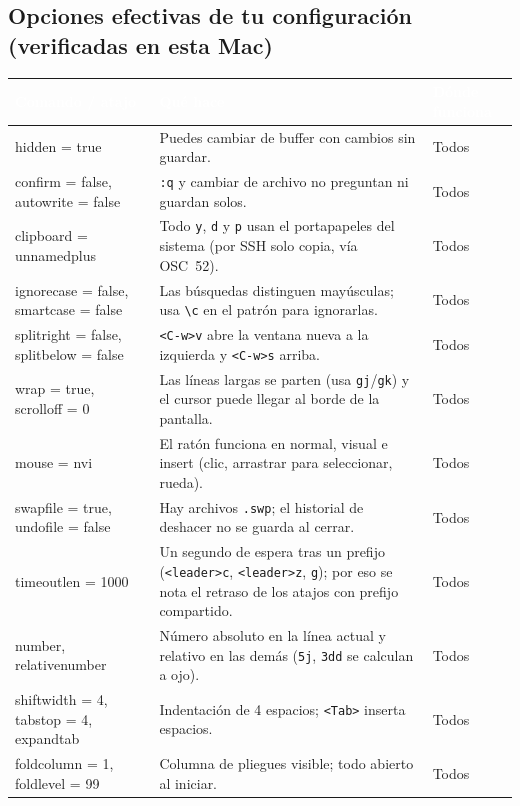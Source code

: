\documentclass[8pt,a4paper,landscape]{extarticle}
\newcommand{\kk}[1]{\texttt{#1}}
\newcommand{\ld}{\texttt{<leader>}}
\newcommand{\bs}{\textbackslash{}}
\newenvironment{cht}{%
  \begin{longtable}{>{\raggedright\arraybackslash\ttfamily}p{0.27\textwidth}
                    >{\raggedright\arraybackslash}p{0.46\textwidth}
                    >{\raggedright\arraybackslash}p{0.21\textwidth}}
  \rowcolor{accent}\textcolor{white}{\textbf{\rmfamily Comando / atajo}} &
  \textcolor{white}{\textbf{Qué hace}} & \textcolor{white}{\textbf{Dónde funciona}} \\
  \endhead
}{\end{longtable}}
\newcommand{\rr}[3]{#1 & #2 & #3 \\}
\newcommand{\rg}[3]{\rowcolor{rowgray}\relax #1 & #2 & #3 \\}
\let\oldsubsection\subsection
\renewcommand{\subsection}{\Needspace{9\baselineskip}\oldsubsection}
\begin{document}
\subsection{Opciones efectivas de tu configuración (verificadas en esta Mac)}
\begin{cht}
\rg{hidden = true}{Puedes cambiar de buffer con cambios sin guardar.}{Todos}
\rr{confirm = false, autowrite = false}{\kk{:q} y cambiar de archivo no preguntan ni guardan solos.}{Todos}
\rg{clipboard = unnamedplus}{Todo \kk{y}, \kk{d} y \kk{p} usan el portapapeles del sistema (por SSH solo copia, vía OSC~52).}{Todos}
\rr{ignorecase = false, smartcase = false}{Las búsquedas distinguen mayúsculas; usa \kk{\bs c} en el patrón para ignorarlas.}{Todos}
\rg{splitright = false, splitbelow = false}{\kk{<C-w>v} abre la ventana nueva a la izquierda y \kk{<C-w>s} arriba.}{Todos}
\rr{wrap = true, scrolloff = 0}{Las líneas largas se parten (usa \kk{gj}/\kk{gk}) y el cursor puede llegar al borde de la pantalla.}{Todos}
\rg{mouse = nvi}{El ratón funciona en normal, visual e insert (clic, arrastrar para seleccionar, rueda).}{Todos}
\rr{swapfile = true, undofile = false}{Hay archivos \kk{.swp}; el historial de deshacer no se guarda al cerrar.}{Todos}
\rg{timeoutlen = 1000}{Un segundo de espera tras un prefijo (\kk{\ld c}, \kk{\ld z}, \kk{g}); por eso se nota el retraso de los atajos con prefijo compartido.}{Todos}
\rr{number, relativenumber}{Número absoluto en la línea actual y relativo en las demás (\kk{5j}, \kk{3dd} se calculan a ojo).}{Todos}
\rg{shiftwidth = 4, tabstop = 4, expandtab}{Indentación de 4 espacios; \kk{<Tab>} inserta espacios.}{Todos}
\rr{foldcolumn = 1, foldlevel = 99}{Columna de pliegues visible; todo abierto al iniciar.}{Todos}
\end{cht}

\end{document}
